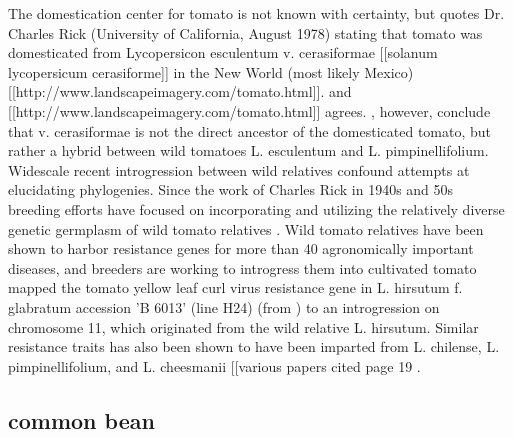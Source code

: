 \documentclass[11pt]{article}
\begin{document}
The domestication center for tomato is not known with certainty, but \cite{sims1979history} quotes Dr. Charles Rick (University of California, August 1978) stating that tomato was domesticated from Lycopersicon esculentum v. cerasiformae [[solanum lycopersicum cerasiforme]] in the New World (most likely Mexico) [[http://www.landscapeimagery.com/tomato.html]].
\cite{robertson2007genetic, bai2007domestication} and [[http://www.landscapeimagery.com/tomato.html]] agrees.
\cite{nesbitt2002comparative}, however, conclude that v. cerasiformae is not the direct ancestor of the domesticated tomato, but rather a hybrid between wild tomatoes L. esculentum and L. pimpinellifolium.
Widescale recent introgression between wild relatives confound attempts at elucidating phylogenies.
Since the work of Charles Rick in 1940s and 50s \cite{rick1953novel}\, breeding efforts have focused on incorporating and utilizing the relatively diverse genetic germplasm of wild tomato relatives \cite{rick1988tomato} \cite{miller1990rflp, rick1982potential}.
Wild tomato relatives have been shown to harbor resistance genes for more than 40 agronomically important diseases, and breeders are working to introgress them into cultivated tomato \cite{rick1995utilization}\.
\cite{hanson2000mapping} mapped the tomato yellow leaf curl virus resistance gene in L. hirsutum f. glabratum accession 'B 6013' (line H24) (from \cite{banerjee1990transfer}) to an introgression on chromosome 11, which originated from the wild relative L. hirsutum.
Similar resistance traits has also been shown to have been imparted from L. chilense, L. pimpinellifolium, and L. cheesmanii [[various papers cited page 19 \cite{hanson2000mapping}\).

\subsection*{common bean}
\end{document}
